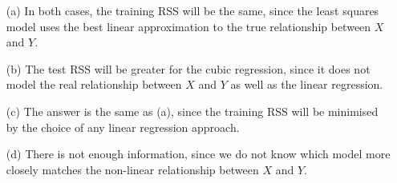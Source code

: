 
\begin{itemize}
    \item[(a)]
        In both cases, the training RSS will be the same, since the least squares
        model uses the best linear approximation to the true relationship between
        $X$ and $Y$.
    \item[(b)]
        The test RSS will be greater for the cubic regression, since it does not
        model the real relationship between $X$ and $Y$ as well as the linear
        regression.
    \item[(c)]
        The answer is the same as (a), since the training RSS will be minimised
        by the choice of any linear regression approach.
    \item[(d)]
        There is not enough information, since we do not know which model more
        closely matches the non-linear relationship between $X$ and $Y$.
\end{itemize}
